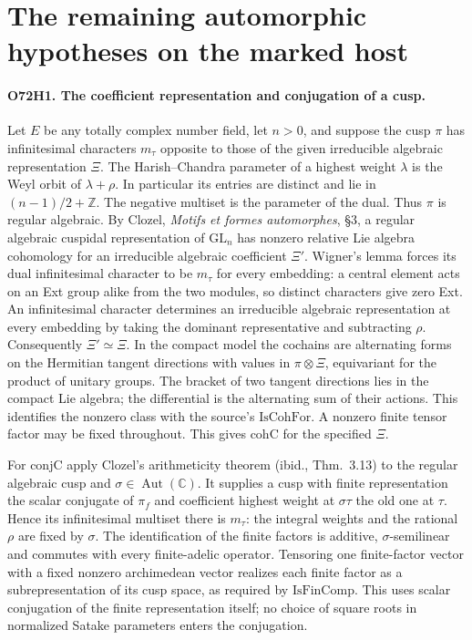 \section{The remaining automorphic hypotheses on the marked host}

\paragraph{O72H1. The coefficient representation and conjugation of a cusp.}
Let $E$ be any totally complex number field, let $n>0$, and suppose
the cusp $\pi$ has infinitesimal characters $m_\tau$ opposite to
those of the given irreducible algebraic representation $\Xi$. The
Harish--Chandra parameter of a highest weight $\lambda$ is the
Weyl orbit of $\lambda+\rho$. In particular its entries are
distinct and lie in $(n-1)/2+\mathbb Z$. The negative multiset
is the parameter of the dual. Thus $\pi$ is regular algebraic.
By Clozel, \emph{Motifs et formes automorphes}, \S3, a regular
algebraic cuspidal representation of $\mathrm{GL}_n$ has nonzero
relative Lie algebra cohomology for an irreducible algebraic
coefficient $\Xi'$. Wigner's lemma forces its dual infinitesimal
character to be $m_\tau$ for every embedding: a central element
acts on an Ext group alike from the two modules, so distinct
characters give zero Ext. An infinitesimal character determines an
irreducible algebraic representation at every embedding by taking
the dominant representative and subtracting $\rho$. Consequently
$\Xi'\simeq\Xi$. In the compact model the cochains are alternating
forms on the Hermitian tangent directions with values in
$\pi\otimes\Xi$, equivariant for the product of unitary groups.
The bracket of two tangent directions lies in the compact Lie algebra;
the differential is the alternating sum of their actions. This
identifies the nonzero class with the source's $\mathrm{IsCohFor}$.
A nonzero finite tensor factor may be fixed throughout. This gives
$\mathrm{cohC}$ for the specified $\Xi$.

For $\mathrm{conjC}$ apply Clozel's arithmeticity theorem
(ibid., Thm.~3.13) to the regular algebraic cusp and
$\sigma\in\operatorname{Aut}(\mathbb C)$. It supplies a cusp with
finite representation the scalar conjugate of $\pi_f$ and coefficient
highest weight at $\sigma\tau$ the old one at $\tau$. Hence its
infinitesimal multiset there is $m_\tau$: the integral weights and
the rational $\rho$ are fixed by $\sigma$. The identification of
the finite factors is additive, $\sigma$-semilinear and commutes
with every finite-adelic operator. Tensoring one finite-factor vector
with a fixed nonzero archimedean vector realizes each finite factor
as a subrepresentation of its cusp space, as required by
$\mathrm{IsFinComp}$. This uses scalar conjugation of the finite
representation itself; no choice of square roots in normalized
Satake parameters enters the conjugation.

